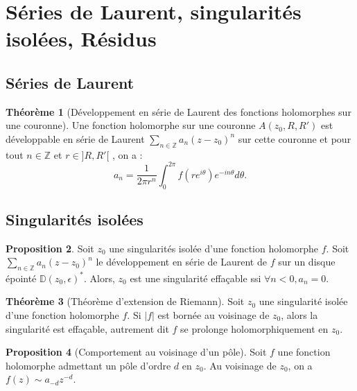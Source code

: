 \documentclass[11pt,a4paper]{article}
\newcommand{\Z}{\mathbb{Z}}
\newcommand{\D}{\mathbb{D}}
\theoremstyle{definition}
\newtheorem{theoreme}{Th\'eor\`eme}[section]
\newtheorem{proposition}[theoreme]{Proposition}
\theoremstyle{plain}
\begin{document}
\section{Séries de Laurent, singularités isolées, Résidus}

\subsection{Séries de Laurent}



\begin{theoreme}[Développement en série de Laurent des fonctions holomorphes sur une couronne]
Une fonction holomorphe sur une couronne $A(z_0,R,R')$ est développable en série de Laurent $\sum_{n\in\Z} a_n(z-z_0)^n$ sur cette couronne et pour tout $n\in\Z$ et $r \in ]R,R'[$ , on a :
\[a_n = \frac{1}{2\pi r^n}\int_0^{2\pi}f\left(re^{i\theta}\right)e^{-in\theta}d\theta. \]
\end{theoreme}



\subsection{Singularités isolées}



\begin{proposition}
Soit $z_0$ une singularités isolée d'une fonction holomorphe $f$.
Soit $\sum_{n\in \Z} a_n(z-z_0)^n$ le développement en série de Laurent de $f$ sur un disque épointé $\D(z_0,\epsilon)^*$.
Alors, $z_0$ est une singularité effaçable ssi $\forall n<0, a_n=0$.
\end{proposition}


\begin{theoreme}[Théorème d'extension de Riemann]
Soit $z_0$ une singularité isolée d'une fonction holomorphe $f$.
Si $|f|$ est bornée au voisinage de $z_0$, alors la singularité est effaçable, autrement dit $f$ se prolonge holomorphiquement en $z_0$.
\end{theoreme}

\begin{proposition}[Comportement au voisinage d'un pôle]
Soit $f$ une fonction holomorphe admettant un pôle d'ordre $d$ en $z_0$.
Au voisinage de $z_0$, on a $f(z) \sim a_{-d}z^{-d}$.
\end{proposition}
\end{document}
